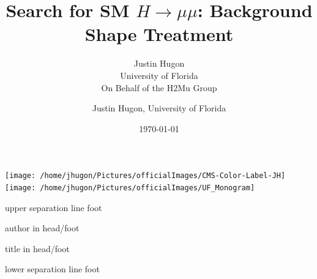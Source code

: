 \documentclass{beamer}
\title{Search for SM $H \rightarrow \mu \mu$: Background Shape Treatment}
\date{\today}
\author{Justin Hugon \\ University of Florida \vspace{0.5em} \\ On Behalf of the H2Mu Group}
\begin{document}
\begin{frame}
  \maketitle
\vspace{-1em}
  \texttt{[image: /home/jhugon/Pictures/officialImages/CMS-Color-Label-JH]}
  \hfill
  \texttt{[image: /home/jhugon/Pictures/officialImages/UF\_Monogram]}
\end{frame}

\makeatletter
{}
{
    \begin{beamercolorbox}[colsep=1.5pt]{upper separation line foot}
    \end{beamercolorbox}
    \begin{beamercolorbox}[ht=2.5ex,dp=1.125ex,%
      leftskip=.3cm,rightskip=.3cm plus1fil]{author in head/foot}%
      \hfill%
      {\insertshortinstitute}%
    \end{beamercolorbox}%
    \begin{beamercolorbox}[ht=2.5ex,dp=1.125ex,%
      leftskip=.3cm,rightskip=.3cm plus1fil]{title in head/foot}%
      {\insertshorttitle \hfill \insertframenumber}%
    \end{beamercolorbox}%
    \begin{beamercolorbox}[colsep=1.5pt]{lower separation line foot}
    \end{beamercolorbox}
}
\makeatother

\author{Justin Hugon, University of Florida}



\end{document}
